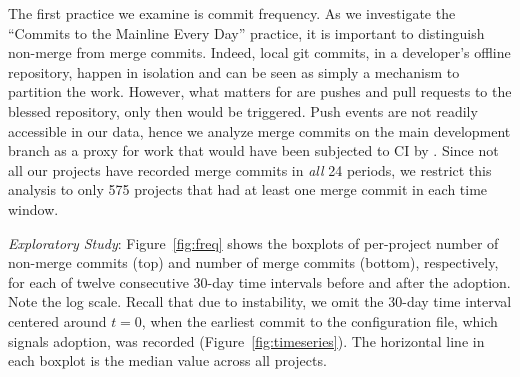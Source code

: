 The first practice we examine is commit frequency.
As we investigate the ``Commits to the Mainline Every Day'' practice, it is
important to distinguish non-merge from merge commits.
Indeed, local git commits, in a developer's offline repository, happen in 
isolation and can be seen as simply a mechanism to partition the work.
However, what matters for \Tvis are pushes and pull requests to the blessed 
\GH repository, \ie only then \Tvi would be triggered.
Push events are not readily accessible in our data, hence we analyze 
merge commits on the main development branch as a proxy for work
that would have been subjected to CI by \Tvi.
Since not all our projects have recorded merge commits in \emph{all} 24 
periods, we restrict this analysis to only 575 projects that had at least one 
merge commit in each time window.




%

\smallskip\noindent \emph{Exploratory Study}: 
Figure~\ref{fig:freq} shows the boxplots of per-project number of non-merge 
commits (top) and number of merge commits (bottom), respectively, for each
of twelve consecutive 30-day time intervals before and after the \Tvis adoption.
Note the log scale.
Recall that due to instability, we omit the 30-day time interval centered 
around $t = 0$, when the earliest commit to the \Tvi configuration file, which 
signals adoption, was recorded (Figure~\ref{fig:timeseries}).
The horizontal line in each boxplot is the median value across all projects.

